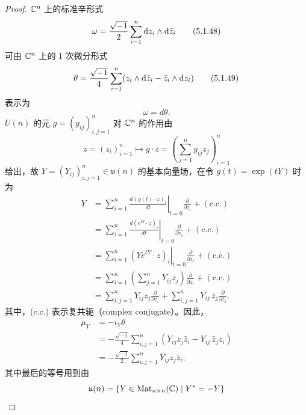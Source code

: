 \begin{proof}
  $\mathbb{C}^n$ 上的标准辛形式
  \begin{equation}
    \omega=\frac{\sqrt{-1}}{2}\sum_{i=1}^n\mathrm{d} z_i\wedge\mathrm{d}\bar z_i
    \tag{5.1.48}
  \end{equation}
  可由 $\mathbb{C}^n$ 上的 1 次微分形式
  \begin{equation}
    \theta=\frac{\sqrt{-1}}{4}\sum_{i=1}^n(z_i\wedge\mathrm{d}\bar z_i-\bar z_i\wedge\mathrm{d} z_i)
    \tag{5.1.49}
  \end{equation}
  表示为
  \begin{equation}
    \omega=d\theta.
    \tag{5.1.50}
  \end{equation}
  $U(n)$ 的元 $g=(g_{ij})_{i,j=1}^n$ 对 $\mathbb{C}^n$ 的作用由
  \begin{equation}
    z=(z_i)_{i=1}^n\mapsto g\cdot z=\left(\sum_{j=1}^n g_{ij}z_j\right)_{i=1}^n
    \tag{5.1.51}
  \end{equation}
  给出，故 $Y=(Y_{ij})_{i,j=1}^n\in\mathfrak{u}(n)$ 的基本向量场，在令 $g(t)=\exp(tY)$ 时为
  \begin{align}
    \underline{Y}&=\sum_{i=1}^n\left.\frac{d(g(t)\cdot z)_i}{dt}\right|_{t=0}\frac{\partial}{\partial z_i}+(\text{c.c.}) \tag{5.1.52}\\
    &=\sum_{i=1}^n\left.\frac{d(e^{tY}\cdot z)_i}{dt}\right|_{t=0}\frac{\partial}{\partial z_i}+(\text{c.c.}) \tag{5.1.53}\\
    &=\sum_{i=1}^n\left.(Ye^{tY}\cdot z)_i\right|_{t=0}\frac{\partial}{\partial z_i}+(\text{c.c.}) \tag{5.1.54}\\
    &=\sum_{i=1}^n\left(\sum_{j=1}^n Y_{ij}z_j\right)\frac{\partial}{\partial z_i}+(\text{c.c.}) \tag{5.1.55}\\
    &=\sum_{i,j=1}^n Y_{ij}z_j\frac{\partial}{\partial z_i}+\sum_{i,j=1}^n\overline{Y_{ij}}\,\bar z_j\frac{\partial}{\partial\bar z_i}. \tag{5.1.56}
  \end{align}
  其中，(c.c.) 表示复共轭（complex conjugate）。因此，
  \begin{align}
    \mu_Y&=-\iota_{\underline{Y}}\theta \tag{5.1.57}\\
    &=-\frac{\sqrt{-1}}{4}\sum_{i,j=1}^n(Y_{ij}z_j\bar z_i-\overline{Y_{ij}}\,\bar z_jz_i) \tag{5.1.58}\\
    &=-\frac{\sqrt{-1}}{2}\sum_{i,j=1}^n Y_{ij}z_j\bar z_i, \tag{5.1.59}
  \end{align}
  其中最后的等号用到由
  \begin{equation}
    \mathfrak{u}(n)=\{Y\in\mathrm{Mat}_{n\times n}(\C)\mid Y^*=-Y\}

\end{equation}
\end{proof}
